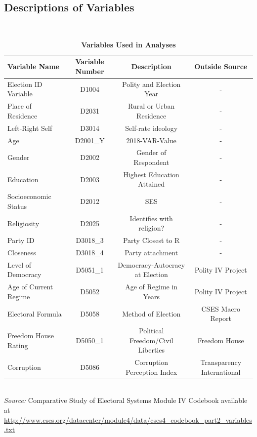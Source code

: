 \documentclass[12pt, titlepage]{article}
\newcommand\e{\emph}
\newcommand\tb{\textbf}
\begin{document}
\begin{appendices}
\clearpage 

\begin{landscape}
\section{Descriptions of Variables }
\label{AppendixA}

~~~\\

\begin{table}[h!]
	\centering
	\def\arraystretch{1.3}
	\caption{\tb{Variables Used in Analyses}}
	\begin{tabulary}{\linewidth}{l c c c}
		\\
		\hline
		\tb{Variable Name}& \tb{Variable Number} & \tb{Description}&\tb{Outside Source} \\
		\hline
		Election ID Variable &D1004&Polity and Election Year&-\\
		Place of Residence&D2031&Rural or Urban Residence&-\\
		Left-Right Self&D3014&Self-rate ideology &-\\
		Age&D2001\_Y&2018-VAR-Value&- \\
		Gender&D2002&Gender of Respondent&- \\
		Education&D2003&Highest Education Attained&- \\
		Socioeconomic Status&D2012&SES&- \\
		Religiosity&D2025&Identifies with religion?&-  \\
		Party ID&D3018\_3&Party Closest to R&- \\
		Closeness&D3018\_4&Party attachment&- \\
		Level of Democracy&D5051\_1&Democracy-Autocracy at Election&Polity IV Project\\
		Age of Current Regime&D5052&Age of Regime in Years& Polity IV Project\\
		Electoral Formula&D5058&Method of Election&CSES Macro Report\\
		Freedom House Rating&D5050\_1&Political Freedom/Civil Liberties&Freedom House \\
		Corruption&D5086&Corruption Perception Index&Transparency International \\
		\hline
	\end{tabulary}\\
	\e{Source:} Comparative Study of Electoral Systems Module IV Codebook available at \url{http://www.cses.org/datacenter/module4/data/cses4_codebook_part2_variables.txt}
	\label{table99}
\end{table}


\end{landscape}
\end{appendices}
\end{document}
